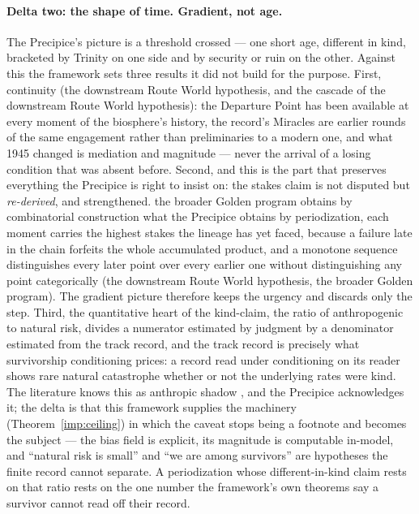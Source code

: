 \documentclass[11pt]{article}
\theoremstyle{plain}
\theoremstyle{definition}
\theoremstyle{remark}
\begin{document}
\paragraph{Delta two: the shape of time. Gradient, not age.} The
Precipice's picture is a threshold crossed --- one short age, different
in kind, bracketed by Trinity on one side and by security or ruin on
the other. Against this the framework sets three results it did not
build for the purpose. First, continuity
(the downstream Route World hypothesis, and the cascade of
the downstream Route World hypothesis): the Departure Point has been available at
every moment of the biosphere's history, the record's Miracles are
earlier rounds of the same engagement rather than preliminaries to a
modern one, and what 1945 changed is mediation and magnitude ---
never the arrival of a losing condition that was absent before.
Second, and this is the part that preserves everything the Precipice
is right to insist on: the stakes claim is not disputed but
\emph{re-derived}, and strengthened. the broader Golden program
obtains by combinatorial construction what the Precipice obtains by
periodization, each moment carries the highest stakes the lineage
has yet faced, because a failure late in the chain forfeits the whole
accumulated product, and a monotone sequence distinguishes every
later point over every earlier one without distinguishing any point
categorically (the downstream Route World hypothesis,
the broader Golden program). The gradient picture therefore keeps
the urgency and discards only the step. Third, the quantitative heart
of the kind-claim, the ratio of anthropogenic to natural risk, divides a numerator estimated by judgment by a denominator estimated
from the track record, and the track record is precisely what
survivorship conditioning prices: a record read under conditioning on
its reader shows rare natural catastrophe whether or not the
underlying rates were kind. The literature knows this as anthropic
shadow \cite{CSB10}, and the Precipice acknowledges it; the delta is
that this framework supplies the machinery
(Theorem~\ref{imp:ceiling}) in which the caveat stops being a footnote and
becomes the subject --- the bias field is explicit, its magnitude is
computable in-model, and ``natural risk is small'' and ``we are among
survivors'' are hypotheses the finite record cannot separate. A
periodization whose different-in-kind claim rests on that ratio rests
on the one number the framework's own theorems say a survivor cannot
read off their record.
\end{document}
